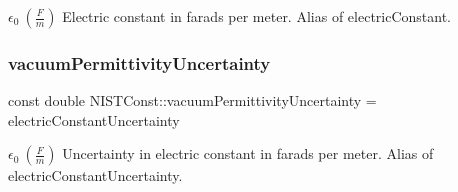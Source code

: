 $\epsilon_0 \ (\frac{F}{m})$ Electric constant in farads per meter. Alias of electric\+Constant. \mbox{\label{group___n_i_s_t_const-_electric_constant_gac4df73e5c5ea0e0829f575ff1c2cc793}} 
\subsubsection{\texorpdfstring{vacuum\+Permittivity\+Uncertainty}{vacuumPermittivityUncertainty}}
{\footnotesize\ttfamily const double N\+I\+S\+T\+Const\+::vacuum\+Permittivity\+Uncertainty = electric\+Constant\+Uncertainty}

$\epsilon_0 \ (\frac{F}{m})$ Uncertainty in electric constant in farads per meter. Alias of electric\+Constant\+Uncertainty. 